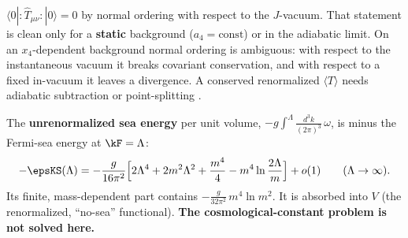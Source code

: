 $\langle0|{:}\hat T_{\mu\nu}{:}|0\rangle=0$ by normal ordering with respect to the $J$-vacuum. That
statement is clean only for a \textbf{static} background ($a_4=\text{const}$) or in the adiabatic
limit. On an $x_4$-dependent background normal ordering is ambiguous: with respect to the
instantaneous vacuum it breaks covariant conservation, and with respect to a fixed in-vacuum it leaves
a divergence. A conserved renormalized $\langle T\rangle$ needs adiabatic subtraction or
point-splitting .

The \textbf{unrenormalized sea energy} per unit volume, $-g\int^{\Lambda}\frac{d^3k}{(2\pi)^3}\,\omega$,
is minus the Fermi-sea energy at $\kF=\Lambda$:
\[
  -\epsKS(\Lambda)=-\frac{g}{16\pi^2}\Bigl[2\Lambda^4+2m^2\Lambda^2+\frac{m^4}{4}-m^4\ln\frac{2\Lambda}{m}\Bigr]+o(1)
  \qquad(\Lambda\to\infty).
\]
Its finite, mass-dependent part contains $-\frac{g}{32\pi^2}\,m^4\ln m^2$. It is absorbed into $V$
(the renormalized, ``no-sea'' functional). \textbf{The cosmological-constant problem is not solved
here.}  

